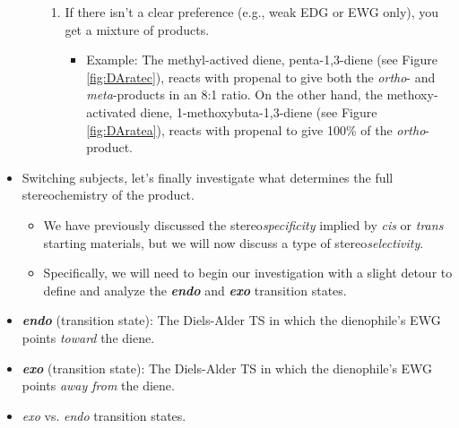 \documentclass[../notes.tex]{subfiles}
\begin{document}
\begin{itemize}
\begin{itemize}
\begin{enumerate}
            \item If there isn't a clear preference (e.g., weak EDG or EWG only), you get a mixture of products.
            \begin{itemize}
                \item Example: The methyl-actived diene, penta-1,3-diene (see Figure \ref{fig:DAratec}), reacts with propenal to give both the \emph{ortho}- and \emph{meta}-products in an 8:1 ratio. On the other hand, the methoxy-activated diene, 1-methoxybuta-1,3-diene (see Figure \ref{fig:DAratea}), reacts with propenal to give 100\% of the \emph{ortho}-product.
            \end{itemize}
        \end{enumerate}
    \end{itemize}
    \item Switching subjects, let's finally investigate what determines the full stereochemistry of the product.
    \begin{itemize}
        \item We have previously discussed the stereo\emph{specificity} implied by \emph{cis} or \emph{trans} starting materials, but we will now discuss a type of stereo\emph{selectivity}.
        \item Specifically, we will need to begin our investigation with a slight detour to define and analyze the \textbf{\emph{endo}} and \textbf{\emph{exo}} transition states.
    \end{itemize}
    \item \textbf{\emph{endo}} (transition state): The Diels-Alder TS in which the dienophile's EWG points \emph{toward} the diene.
    \item \textbf{\emph{exo}} (transition state): The Diels-Alder TS in which the dienophile's EWG points \emph{away from} the diene.
    \pagebreak
    \item \emph{exo} vs. \emph{endo} transition states.
    \begin{figure}[h!]
        \centering
        \footnotesize
        \begin{subfigure}[b]{0.35\linewidth}
            \centering
\end{subfigure}
\end{figure}
\end{itemize}
\end{document}
